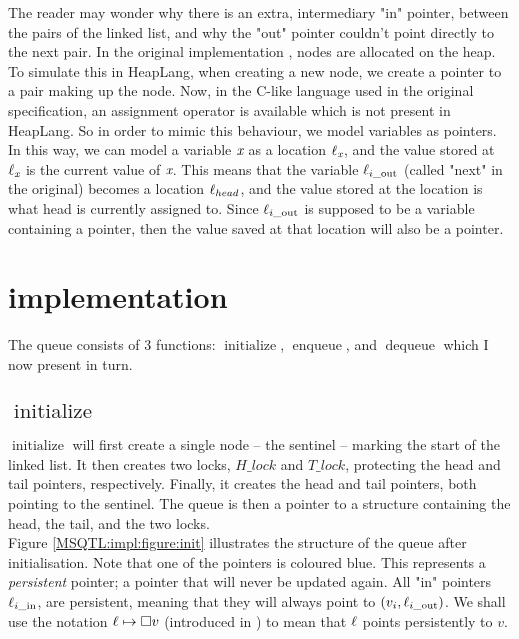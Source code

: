 \documentclass[twoside,11pt,openright]{report}
\newcommand{\initialise}{\operatorname{initialize}}
\newcommand{\enqueue}{\operatorname{enqueue}}
\newcommand{\dequeue}{\operatorname{dequeue}}
\newcommand{\locin}[1]{\loc_{#1\_\text{in}}}
\newcommand{\locout}[1]{\loc_{#1\_\text{out}}}
\begin{document}
The reader may wonder why there is an extra, intermediary "in" pointer, between the pairs of the linked list, and why the "out" pointer couldn't point directly to the next pair. In the original implementation \cite{DBLP:conf/podc/MichaelS96}, nodes are allocated on the heap. To simulate this in HeapLang, when creating a new node, we create a pointer to a pair making up the node. Now, in the C-like language used in the original specification, an assignment operator is available which is not present in HeapLang. So in order to mimic this behaviour, we model variables as pointers. In this way, we can model a variable $\textit{x}$ as a location $\ell_{\textit{x}}$, and the value stored at $\ell_{\textit{x}}$ is the current value of $\textit{x}$. This means that the variable $\locout{i}$ (called "next" in the original) becomes a location $\ell_{head}$, and the value stored at the location is what head is currently assigned to. Since $\locout{i}$ is supposed to be a variable containing a pointer, then the value saved at that location will also be a pointer.


\section{implementation}\label{section:two_lock:impl}

The queue consists of 3 functions: $\initialise$, $\enqueue$, and $\dequeue$ which I now present in turn.

\subsection[initialise]{$\initialise$}

$\initialise$ will first create a single node -- the sentinel -- marking the start of the linked list. It then creates two locks, $H\_lock$ and $T\_lock$, protecting the head and tail pointers, respectively. Finally, it creates the head and tail pointers, both pointing to the sentinel. The queue is then a pointer to a structure containing the head, the tail, and the two locks.\\
Figure \ref{MSQTL:impl:figure:init} illustrates the structure of the queue after initialisation. Note that one of the pointers is coloured blue. This represents a \emph{persistent} pointer; a pointer that will never be updated again. All "in" pointers $\locin{i}$, are persistent, meaning that they will always point to $(v_i, \locout{i})$. We shall use the notation $\ell \mapsto \square v$ (introduced in \cite{DBLP:conf/cpp/VindumB21}) to mean that $\ell$ points persistently to $v$.
\end{document}
